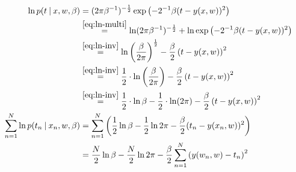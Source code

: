 \documentclass[a4paper]{article}
\newcommand\given{
  \nonscript\:
  \vert
  \nonscript\:
  \mathopen{}
  \allowbreak
}
\begin{document}
\begin{align}
  \ln{p(t \given x,w,\beta)} &= (2 \pi \beta^{-1})^{-\frac12} \exp\left(-2^{-1} \beta (t - y(x,w))^2\right) \\
      &\overset{\eqref{eq:ln-multi}}{=} \ln(2 \pi \beta^{-1})^{-\frac12} + \ln\exp\left(-2^{-1} \beta (t - y(x,w))^2\right) \\
      &\overset{\eqref{eq:ln-inv}}{=} \ln\left(\frac{\beta}{2\pi}\right)^{\frac12} - \frac{\beta}{2}\left(t - y(x,w)\right)^2 \\
      &\overset{\eqref{eq:ln-inv}}{=} \frac12 \cdot \ln\left(\frac{\beta}{2\pi}\right) - \frac{\beta}{2}\left(t - y(x,w)\right)^2 \\
      &\overset{\eqref{eq:ln-inv}}{=} \frac12 \cdot \ln \beta - \frac12 \cdot \ln(2\pi) - \frac{\beta}{2}\left(t - y(x,w)\right)^2 \\
  \sum_{n=1}^N \ln{p(t_n \given x_n,w,\beta)} &= \sum_{n=1}^N \left(\frac12 \ln{\beta} - \frac12 \ln{2\pi} - \frac\beta2 (t_n - y(x_n, w))^2\right) \\
      &= \frac{N}{2} \ln\beta - \frac{N}{2} \ln{2\pi} - \frac{\beta}{2} \sum_{n=1}^N \left(y(w_n, w) - t_n\right)^2
\end{align}
\end{document}
